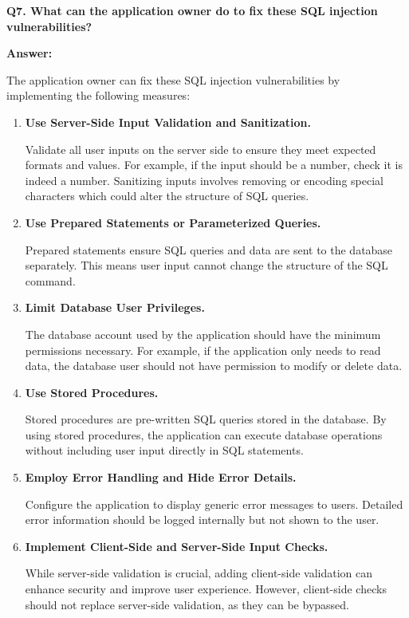 \documentclass[12pt]{article}
\begin{document}
\textbf{Q7. What can the application owner do to fix these SQL injection vulnerabilities?}

\textbf{Answer:}

The application owner can fix these SQL injection vulnerabilities by implementing the following measures:

\begin{enumerate}
\item \textbf{Use Server-Side Input Validation and Sanitization.}

Validate all user inputs on the server side to ensure they meet expected formats and values. For example, if the input should be a number, check it is indeed a number. Sanitizing inputs involves removing or encoding special characters which could alter the structure of SQL queries.

\item \textbf{Use Prepared Statements or Parameterized Queries.}

Prepared statements ensure SQL queries and data are sent to the database separately. This means  user input cannot change the structure of the SQL command. 
\item \textbf{Limit Database User Privileges.}

The database account used by the application should have the minimum permissions necessary. For example, if the application only needs to read data, the database user should not have permission to modify or delete data. 

\item \textbf{Use Stored Procedures.}

Stored procedures are pre-written SQL queries stored in the database. By using stored procedures, the application can execute database operations without including user input directly in SQL statements. 

\item \textbf{Employ Error Handling and Hide Error Details.}

Configure the application to display generic error messages to users. Detailed error information should be logged internally but not shown to the user. 

\item \textbf{Implement Client-Side and Server-Side Input Checks.}

While server-side validation is crucial, adding client-side validation can enhance security and improve user experience. However, client-side checks should not replace server-side validation, as they can be bypassed.


\end{enumerate}
\end{document}
